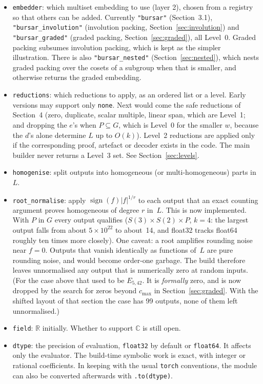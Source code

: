 \documentclass[11pt]{article}
\theoremstyle{definition}
\theoremstyle{remark}
\begin{document}
\begin{itemize}
  \item \texttt{embedder}: which multiset embedding to use (layer 2), chosen
    from a registry so that others can be added. Currently
    \texttt{"bursar"} (Section~3.1), \texttt{"bursar\_involution"} (involution
    packing, Section~\ref{sec:involution}) and \texttt{"bursar\_graded"} (graded
    packing, Section~\ref{sec:graded}), all Level~0. Graded packing subsumes
    involution packing, which is kept as the simpler illustration. There is also
    \texttt{"bursar\_nested"} (Section~\ref{sec:nested}), which nests graded
    packing over the cosets of a subgroup when that is smaller, and otherwise
    returns the graded embedding.
  \item \texttt{reductions}: which reductions to apply, as an ordered list or
    a level. Early versions may support only \texttt{none}. Next would come
    the safe reductions of Section~4 (zero, duplicate, scalar multiple, linear
    span, which are Level~1; and dropping the $e$'s when $P \subseteq G$,
    which is Level~0 for the smaller $w$, because the $d$'s alone determine $L$
    up to $O(k)$).
    Level~2 reductions are applied only if the corresponding proof, artefact or
    decoder exists in the code. The main builder never returns a Level~3 set.
    See Section~\ref{sec:levels}.
  \item \texttt{homogenise}: split outputs into homogeneous (or
    multi-homogeneous) parts in $L$.
  \item \texttt{root\_normalise}: apply $\operatorname{sign}(f)|f|^{1/r}$ to
    each output that an exact counting argument proves homogeneous of degree
    $r$ in~$L$. This is now implemented. With $P$ in $G$ every output qualifies
    ($S(3)\times S(2)\times P$, $k = 4$: the largest output falls from about
    $5 \times 10^{22}$ to about~14, and float32 tracks float64 roughly ten times
    more closely). One caveat: a root amplifies rounding noise near $f = 0$.
    Outputs that vanish identically as functions of~$L$ are pure rounding noise,
    and would become order-one garbage. The build therefore leaves unnormalised
    any output that is numerically zero at random inputs. (For the case above
    that used to be $E_{5,42}$. It is \emph{formally} zero, and is now dropped
    by the search for zeros beyond $c_{\max}$ in Section~\ref{sec:graded}.
    With the shifted layout of that section the case has 99 outputs, none of
    them left unnormalised.)
  \item \texttt{field}: $\mathbb{R}$ initially. Whether to support
    $\mathbb{C}$ is still open.
  \item \texttt{dtype}: the precision of evaluation, \texttt{float32} by
    default or \texttt{float64}. It affects only the evaluator. The build-time
    symbolic work is exact, with integer or rational coefficients. In keeping
    with the usual \texttt{torch} conventions, the module can also be
    converted afterwards with \texttt{.to(dtype)}.
\end{itemize}
\end{document}
